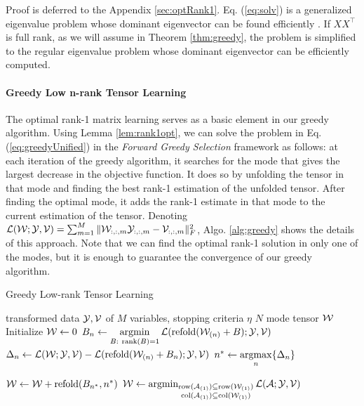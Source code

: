 Proof is deferred to the Appendix \ref{sec:optRank1}. Eq. (\ref{eq:solv}) is a generalized eigenvalue problem whose dominant eigenvector can be found efficiently \cite{jpen2000}. If $XX^{\top}$ is full rank, as we will assume in Theorem \ref{thm:greedy}, the problem is simplified to the regular eigenvalue problem whose dominant eigenvector can be efficiently computed.

\paragraph{Greedy Low n-rank Tensor Learning} The optimal rank-1 matrix learning serves as a basic element in our greedy algorithm. 
Using Lemma \ref{lem:rank1opt}, we can solve the problem in Eq. (\ref{eq:greedyUnified}) in the \textit{Forward Greedy Selection} framework as follows:  at each iteration of the greedy algorithm, it searches for the mode that gives the largest decrease in the objective function. It does so by unfolding the tensor in that mode and finding the best rank-1 estimation of the unfolded tensor. After finding the optimal mode, it adds the rank-1 estimate in that mode to the current estimation of the tensor. Denoting $\mathcal{L}({\mathcal W};{\mathcal Y}, {\mathcal V} ) = \sum_{m=1}^{M} \|{\mathcal W}_{:, :, m}{\mathcal Y}_{:, :, m} - {\mathcal V}_{:, :, m} \|^2_F$, Algo. \ref{alg:greedy} shows the details of this approach.  Note that we can find the optimal rank-1 solution in only one of the modes, but it is enough to guarantee the convergence of our greedy algorithm. %

\begin{algorithm}[t]
 \caption{Greedy Low-rank Tensor Learning }
 \label{alg:greedy}
\begin{algorithmic}[1]
   transformed data ${\mathcal Y}, {\mathcal V}$ of $M$ variables, stopping criteria $\eta$
    $N$ mode tensor ${\mathcal W}$ 
  \STATE  Initialize ${\mathcal W} \gets 0$
  \REPEAT 
    \STATE $B_n \leftarrow  \operatorname*{argmin}\limits_{B:~\mathrm{rank}(B) = 1}\mathcal{L}(\mathrm{refold}({\mathcal W}_{(n)}+B); {\mathcal Y}, {\mathcal V})$
 	\STATE  
$\Delta_n\gets \mathcal{L}({\mathcal W};{\mathcal Y}, {\mathcal V} ) -  \mathcal{L}(\mathrm{refold}({\mathcal W}_{(n)}+B_n);{\mathcal Y}, {\mathcal V} )$
	\ENDFOR
	\STATE $ n^{*}\leftarrow \operatorname*{argmax}\limits_{n} \{\Delta_n\}$

 \STATE
 ${\mathcal W} \gets {\mathcal W} + \mathrm{refold}(B_{n^{*}},n^{*} )$
 \ENDIF
 \STATE ${\mathcal W} \gets \operatorname*{argmin}_{\begin{subarray}{c}\mathrm{row}({\mathcal A}_{(1)}) \subseteq \mathrm{row}({\mathcal W}_{(1)})\\ \mathrm{col}({\mathcal A}_{(1)}) \subseteq \mathrm{col}({\mathcal W}_{(1)})\end{subarray} } \mathcal{L}({\mathcal A};{\mathcal Y}, {\mathcal V} ) $ 
\end{algorithmic}
\end{algorithm}

